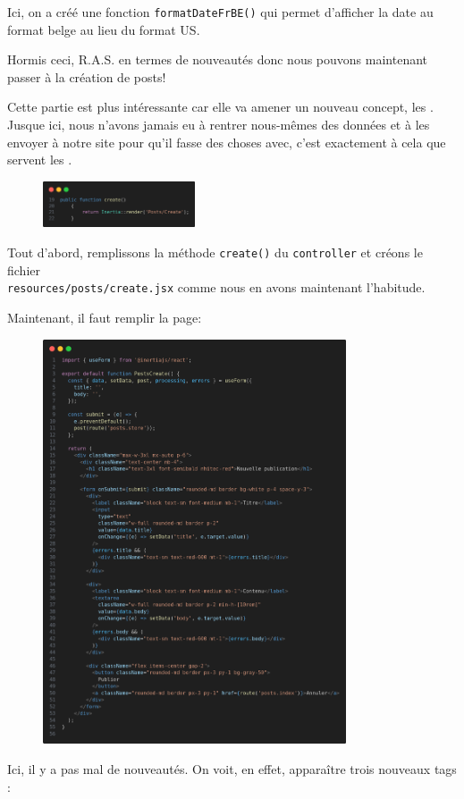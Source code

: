 Ici, on a créé une fonction \texttt{formatDateFrBE()} qui permet d'afficher la date au format belge au lieu du format US.

Hormis ceci, R.A.S. en termes de nouveautés donc nous pouvons maintenant passer à la création de posts!


Cette partie est plus intéressante car elle va amener un nouveau concept, les \forms{}. Jusque ici, nous n'avons jamais eu à rentrer nous-mêmes des données et à les envoyer à notre site pour qu'il fasse des choses avec, c'est exactement à cela que servent les \forms{}.

\begin{figure}
    \vspace{-0.5cm}
    \includegraphics[width=0.4\textwidth]{figures-C1/postscontroller_create.png}
\end{figure}
Tout d'abord, remplissons la méthode \verb|create()| du \texttt{controller} et créons le fichier \\ \verb|resources/posts/create.jsx| comme nous en avons maintenant l'habitude.

Maintenant, il faut remplir la page:

\begin{figure}[!h]
    \centering
    \includegraphics[width=0.8\textwidth]{figures-C1/posts_create.png}
\end{figure}
Ici, il y a pas mal de nouveautés. On voit, en effet, apparaître trois nouveaux tags \html:

